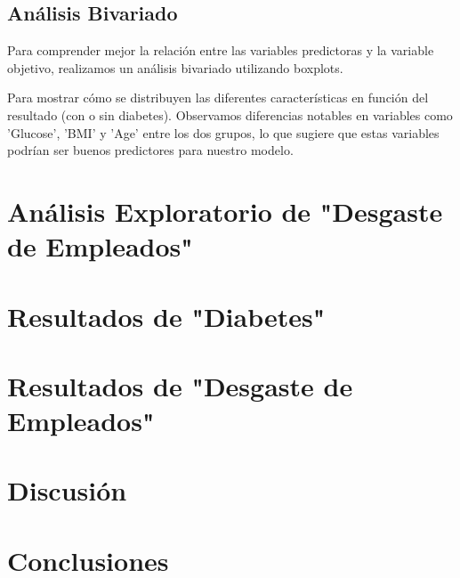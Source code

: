 \documentclass[conference]{IEEEtran}
\begin{document}
\subsection{Análisis Bivariado}

Para comprender mejor la relación entre las variables predictoras y la variable objetivo, realizamos un análisis bivariado utilizando boxplots.

Para mostrar cómo se distribuyen las diferentes características en función del resultado (con o sin diabetes). Observamos diferencias notables en variables como 'Glucose', 'BMI' y 'Age' entre los dos grupos, lo que sugiere que estas variables podrían ser buenos predictores para nuestro modelo.

\section{Análisis Exploratorio de "Desgaste de Empleados"}

\section{Resultados de "Diabetes"}

\section{Resultados de "Desgaste de Empleados"}

\section{Discusión}

\section{Conclusiones}


\begin{thebibliography}{00}
\end{thebibliography}
\end{document}
